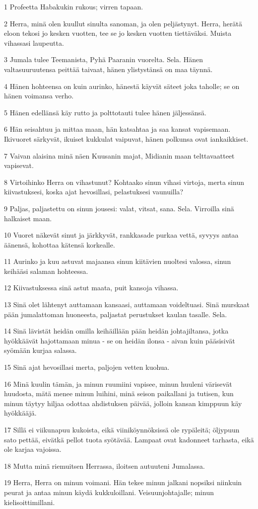 \par 1 Profeetta Habakukin rukous; virren tapaan.
\par 2 Herra, minä olen kuullut sinulta sanoman, ja olen peljästynyt. Herra, herätä eloon tekosi jo kesken vuotten, tee se jo kesken vuotten tiettäväksi. Muista vihassasi laupeutta.
\par 3 Jumala tulee Teemanista, Pyhä Paaranin vuorelta. Sela. Hänen valtasuuruutensa peittää taivaat, hänen ylistystänsä on maa täynnä.
\par 4 Hänen hohteensa on kuin aurinko, hänestä käyvät säteet joka taholle; se on hänen voimansa verho.
\par 5 Hänen edellänsä käy rutto ja polttotauti tulee hänen jäljessänsä.
\par 6 Hän seisahtuu ja mittaa maan, hän katsahtaa ja saa kansat vapisemaan. Ikivuoret särkyvät, ikuiset kukkulat vaipuvat, hänen polkunsa ovat iankaikkiset.
\par 7 Vaivan alaisina minä näen Kuusanin majat, Midianin maan telttavaatteet vapisevat.
\par 8 Virtoihinko Herra on vihastunut? Kohtaako sinun vihasi virtoja, merta sinun kiivastuksesi, koska ajat hevosillasi, pelastuksesi vaunuilla?
\par 9 Paljas, paljastettu on sinun jousesi: valat, vitsat, sana. Sela. Virroilla sinä halkaiset maan.
\par 10 Vuoret näkevät sinut ja järkkyvät, rankkasade purkaa vettä, syvyys antaa äänensä, kohottaa kätensä korkealle.
\par 11 Aurinko ja kuu astuvat majaansa sinun kiitävien nuoltesi valossa, sinun keihääsi salaman hohteessa.
\par 12 Kiivastuksessa sinä astut maata, puit kansoja vihassa.
\par 13 Sinä olet lähtenyt auttamaan kansaasi, auttamaan voideltuasi. Sinä murskaat pään jumalattoman huoneesta, paljastat perustukset kaulan tasalle. Sela.
\par 14 Sinä lävistät heidän omilla keihäillään pään heidän johtajiltansa, jotka hyökkäävät hajottamaan minua - se on heidän ilonsa - aivan kuin pääsisivät syömään kurjaa salassa.
\par 15 Sinä ajat hevosillasi merta, paljojen vetten kuohua.
\par 16 Minä kuulin tämän, ja minun ruumiini vapisee, minun huuleni värisevät huudosta, mätä menee minun luihini, minä seison paikallani ja tutisen, kun minun täytyy hiljaa odottaa ahdistuksen päivää, jolloin kansan kimppuun käy hyökkääjä.
\par 17 Sillä ei viikunapuu kukoista, eikä viiniköynnöksissä ole rypäleitä; öljypuun sato pettää, eivätkä pellot tuota syötävää. Lampaat ovat kadonneet tarhasta, eikä ole karjaa vajoissa.
\par 18 Mutta minä riemuitsen Herrassa, iloitsen autuuteni Jumalassa.
\par 19 Herra, Herra on minun voimani. Hän tekee minun jalkani nopsiksi niinkuin peurat ja antaa minun käydä kukkuloillani. Veisuunjohtajalle; minun kielisoittimillani.



